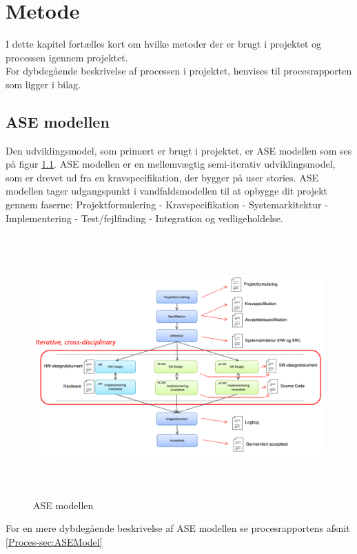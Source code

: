 \chapter{Metode}
I dette kapitel fortælles kort om hvilke metoder der er brugt i projektet og processen igennem projektet. \\
For dybdegående beskrivelse af processen i projektet, henvises til procesrapporten som ligger i bilag.

\section{ASE modellen}
Den udviklingsmodel, som primært er brugt i projektet, er ASE modellen som ses på figur \ref{fig:ASE}. ASE modellen\cite{ASE} er en mellemvægtig semi-iterativ udviklingsmodel, som er drevet ud fra en kravspecifikation, der bygger på user stories. ASE modellen tager udgangspunkt i vandfaldsmodellen til at opbygge dit projekt gennem faserne: Projektformulering - Kravspecifikation - Systemarkitektur -  Implementering -  Test/fejlfinding -  Integration og vedligeholdelse.

\begin{figure} [!ht]
	\begin{center}
		\includegraphics[height=10cm, width=12cm]{Metode/ASEModellen}
	\end{center}
	\caption{ASE modellen}
	\label{fig:ASE}
\end{figure}

For en mere dybdegående beskrivelse af ASE modellen se procesrapportens afsnit \ref{Proces-sec:ASEModel} \\

